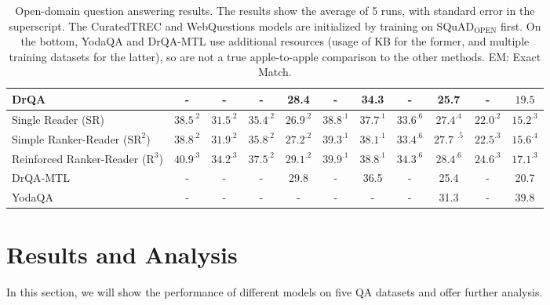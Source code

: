 \documentclass[letterpaper]{article} \usepackage{aaai18}  \usepackage{times}  \usepackage{helvet}  \usepackage{courier}  \usepackage{url}  \usepackage{graphicx}  \usepackage{comment}
\begin{document}
\begin{table*}[t]
\begin{tabular}{lcccccccccc}
DrQA~\cite{chen2017reading}             & -             & -             & -             & 28.4  & -                & 34.3        & -                & 25.7             & -                & $\mathbf{19.5}$                         \\
\midrule
Single Reader (SR)    & $\text{38.5}^{.2}$          & $\text{31.5}^{.2}$          & $\text{35.4}^{.2}$         & $\text{26.9}^{.2}$   & $\text{38.8}^{.1}$           & $\text{37.7}^{.1}$       & $\text{33.6}^{.6}$            & $\text{27.4}^{.4}$           & $\text{22.0}^{.2}$            & $\text{15.2}^{.3}$                         \\
Simple Ranker-Reader ($\text{SR}^2$)       & ${38.8}^{.2} $         & $\text{31.9}^{.2}$          & $\text{35.8}^{.2}$          & $\text{27.2}^{.2}$         & $\text{39.3}^{.1}$              & $\text{38.1}^{.1}$  & $\text{33.4}^{.6}$            & $\text{27.7 }^{.5}$             & $\text{22.5}^{.3} $            & ${15.6 }^{.4}$                          \\
Reinforced Ranker-Reader ($\text{R}^3$)  & $\mathbf{40.9}^{.3}$ & $\mathbf{34.2}^{.3}$ & $\mathbf{37.5}^{.2}$ & $\mathbf{29.1}^{.2}$ & $\mathbf{39.9}^{.1}$    & $\mathbf{38.8}^{.1}$ & $\mathbf{34.3}^{.6}$    & $\mathbf{28.4}^{.6}$    & $\mathbf{24.6}^{.3}$    & $\text{17.1}^{.3}$      \\
\hline
\hline
DrQA-MTL~\cite{chen2017reading}               & -             & -             & -             & 29.8     & -                & 36.5     & -                & 25.4             & -                & 20.7                         \\
YodaQA~\cite{baudivs2015modeling}           & -             & -             & -             & -          & -           & -                & -      & 31.3             & -                & 39.8                        \\
\bottomrule
\end{tabular}
\normalsize
\caption{Open-domain question answering results. The results show the average of 5 runs, with standard error in the superscript.  The CuratedTREC and WebQuestions models are initialized by training on SQuAD$_{\textrm{OPEN}}$ first. On the bottom, YodaQA and DrQA-MTL use additional resources (usage of KB for the former, and multiple training datasets for the latter), so are not a true apple-to-apple comparison to the other methods. EM: Exact Match.  }
\label{tab:results}
\end{table*}

\section{Results and Analysis}
In this section, we will show the performance of different models on five QA datasets and offer further analysis. 
\end{document}

